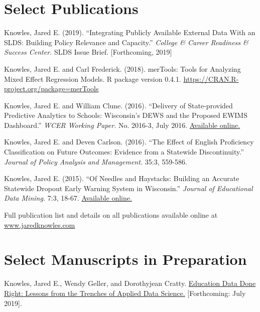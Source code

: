 \documentclass[margin,line]{res}
\begin{document}
\begin{resume}
\section{\sc Select Publications}

Knowles, Jared E. (2019). ``Integrating Publicly Available External Data With an SLDS: Building 
Policy Relevance and Capacity.'' \emph{College & Career Readiness & Success Center.} 
SLDS Issue Brief. [Forthcoming, 2019]

Knowles, Jared E. and Carl Frederick. (2018). merTools: Tools for Analyzing Mixed 
Effect Regression Models. R package version 0.4.1. 
\url{https://CRAN.R-project.org/package=merTools}

Knowles, Jared E. and William Clune. (2016). ``Delivery of State-provided Predictive
Analytics to Schools: Wisconsin’s DEWS and the Proposed EWIMS Dashboard.'' 
\emph{WCER Working Paper.} No. 2016-3, July 2016. \href{http://wcer-web.ad.education.wisc.edu/docs/working-papers/Working_Paper_No_2016_03.pdf}{Available online.}

Knowles, Jared E. and Deven Carlson. (2016). ``The Effect of English Proficiency Classification 
on Future Outcomes: Evidence from a Statewide Discontinuity.'' \emph{Journal of Policy Analysis 
and Management.} 35:3, 559-586. 

Knowles, Jared E. (2015). ``Of Needles and Haystacks: Building an Accurate Statewide 
Dropout Early Warning System in Wisconsin.'' \emph{Journal of Educational Data 
Mining.} 7:3, 18-67. 
\href{http://www.educationaldatamining.org/JEDM/index.php/JEDM/article/view/JEDM082}{Available online.}

Full publication list and details on all publications available online at 
\url{www.jaredknowles.com}

\section{\sc Select Manuscripts in Preparation}

Knowles, Jared E., Wendy Geller, and Dorothyjean Cratty. \uline{Education Data Done Right: Lessons from the Trenches of Applied Data Science.} [Forthcoming: July 2019].


\vspace*{5mm}


\end{resume}
\end{document}
